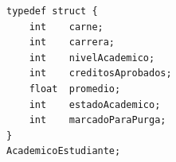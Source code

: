 \begin{lstlisting}[style=pseudocodigo]
typedef struct {
    int    carne;
    int    carrera;
    int    nivelAcademico;
    int    creditosAprobados;
    float  promedio;
    int    estadoAcademico;
    int    marcadoParaPurga;
}
AcademicoEstudiante;
\end{lstlisting}
